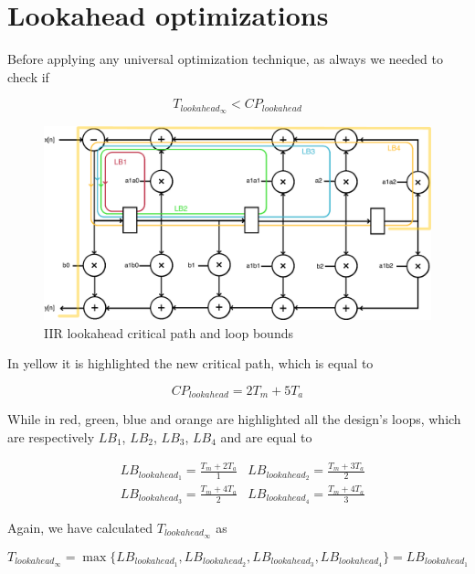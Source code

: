 \section{Lookahead optimizations}
\label{sec:iir_opt}

Before applying any universal optimization technique, as always we needed to check if

$$T_{lookahead_{\infty}} < CP_{lookahead}$$

\begin{figure}[!ht]
	\centering
	\includegraphics[width=0.7\linewidth]{./chapters/pictures/loop_bound_iir_lookahead.pdf}
	\caption{IIR lookahead critical path and loop bounds}
	\label{fig:lookahead_lb}
\end{figure}

In yellow it is highlighted the new critical path, which is equal to

\begin{equation}\nonumber
    \label{eq:lookahead_cp}
    CP_{lookahead} = 2T_{m} + 5T_{a}
\end{equation}

While in red, green, blue and orange are highlighted all the design's loops, which are respectively $LB_{1}$, $LB_{2}$, $LB_{3}$, $LB_{4}$ and are equal to

\begin{align}\nonumber
    &LB_{lookahead_{1}} = \frac{T_{m} + 2T_{a}}{1} &LB_{lookahead_{2}} = \frac{T_{m} + 3T_{a}}{2} \\ \nonumber
    &LB_{lookahead_{3}} = \frac{T_{m} + 4T_{a}}{2} &LB_{lookahead_{4}} = \frac{T_{m} + 4T_{a}}{3} \nonumber
\end{align}

Again, we have calculated $T_{lookahead_{\infty}}$ as

\begin{equation}\nonumber
    T_{lookahead_{\infty}} = \max \lbrace LB_{lookahead_{1}}, LB_{lookahead_{2}}, LB_{lookahead_{3}}, LB_{lookahead_{4}} \rbrace = LB_{lookahead_{1}}
\end{equation}

